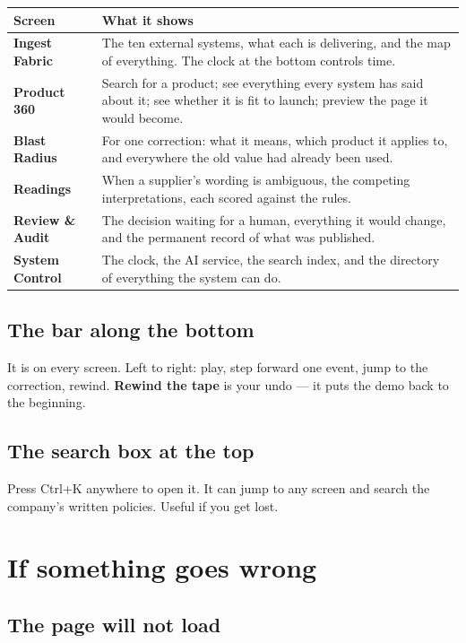 \documentclass[11pt,a4paper]{article}
\newcommand{\ui}[1]{\textbf{#1}}          %
\newcommand{\key}[1]{\textsf{\small #1}}  %
\begin{document}
\begin{longtable}{@{}p{3.4cm}p{11.6cm}@{}}
\toprule
\textbf{Screen} & \textbf{What it shows} \\
\midrule
\endhead
\ui{Ingest Fabric} & The ten external systems, what each is delivering, and the
map of everything. The clock at the bottom controls time. \\[4pt]
\ui{Product 360} & Search for a product; see everything every system has said
about it; see whether it is fit to launch; preview the page it would become. \\[4pt]
\ui{Blast Radius} & For one correction: what it means, which product it applies
to, and everywhere the old value had already been used. \\[4pt]
\ui{Readings} & When a supplier's wording is ambiguous, the competing
interpretations, each scored against the rules. \\[4pt]
\ui{Review \& Audit} & The decision waiting for a human, everything it would
change, and the permanent record of what was published. \\[4pt]
\ui{System Control} & The clock, the AI service, the search index, and the
directory of everything the system can do. \\
\bottomrule
\end{longtable}

\subsection{The bar along the bottom}

It is on every screen. Left to right: play, step forward one event, jump to the
correction, rewind. \ui{Rewind the tape} is your undo --- it puts the demo back
to the beginning.

\subsection{The search box at the top}

Press \key{Ctrl}+\key{K} anywhere to open it. It can jump to any screen and
search the company's written policies. Useful if you get lost.

\section{If something goes wrong}

\subsection{The page will not load}
\end{document}
